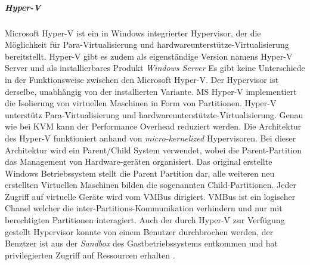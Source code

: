 \subparagraph{Hyper-V}
Microsoft Hyper-V ist ein in Windows integrierter Hypervisor, der die Möglichkeit für Para-Virtualisierung und hardwareunterstütze-Virtualisierung bereitstellt. Hyper-V gibt es zudem als eigenständige Version namens Hyper-V Server und als installierbares Produkt \emph{Windows Server} Es gibt keine Unterschiede in der Funktionsweise zwischen den Microsoft Hyper-V. Der Hypervisor ist derselbe, unabhängig von der installierten Variante. MS Hyper-V implementiert die Isolierung von virtuellen Maschinen in Form von Partitionen. Hyper-V unterstütz Para-Virtualisierung und hardwareunterstützte-Virtualisierung. Genau wie bei KVM kann der Performance Overhead reduziert werden. Die Architektur des Hyper-V funktioniert anhand von \emph{micro-kernelized} Hypervisoren. Bei dieser Architektur wird ein Parent/Child System verwendet, wobei die Parent-Partition das Management von Hardware-geräten organisiert. Das original erstellte Windows Betriebssystem stellt die Parent Partition dar, alle weiteren neu erstellten Virtuellen Maschinen bilden die sogenannten Child-Partitionen. Jeder Zugriff auf virtuelle Geräte wird vom VMBus dirigiert. VMBus ist ein logischer Chanel welcher die inter-Partitions-Kommunikation verhindern und nur mit berechtigten Partitionen interagiert. Auch der durch Hyper-V zur Verfügung gestellt Hypervisor konnte von einem Benutzer durchbrochen werden, der Benztzer ist aus der \emph{Sandbox} des Gastbetriebssystems entkommen und hat privilegierten Zugriff auf Ressourcen erhalten \cite{Fayyad-Kazan2013BenchmarkingHypervisors}.
